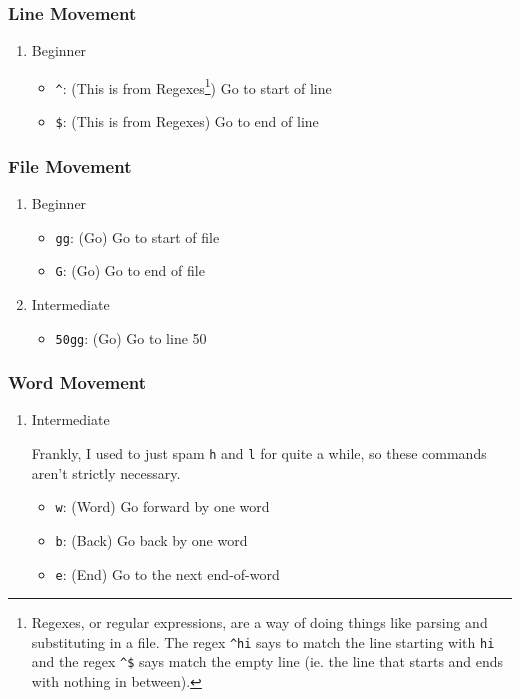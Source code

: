 \documentclass[11pt]{article}
\begin{document}
\subsubsection{Line Movement}
\label{sec:orgc0ae1f2}
\begin{enumerate}
\item Beginner
\label{sec:org67b2ee7}
\begin{itemize}
\item \texttt{\textasciicircum{}}: (This is from Regexes\footnote{Regexes, or regular expressions, are a way of doing things like 
parsing and substituting in a file. The regex \texttt{\textasciicircum{}hi} says to match the 
line starting with \texttt{hi} and the regex \texttt{\textasciicircum{}\$} says match the empty line 
(ie. the line that starts and ends with nothing in between).}) Go to start of line
\item \texttt{\$}: (This is from Regexes) Go to end of line
\end{itemize}
\end{enumerate}
\subsubsection{File Movement}
\label{sec:orgd1d1f8c}
\begin{enumerate}
\item Beginner
\label{sec:orgae4b41d}
\begin{itemize}
\item \texttt{gg}: (Go) Go to start of file
\item \texttt{G}: (Go) Go to end of file
\end{itemize}
\item Intermediate
\label{sec:org197d9e3}
\begin{itemize}
\item \texttt{50gg}: (Go) Go to line 50
\end{itemize}
\end{enumerate}
\subsubsection{Word Movement}
\label{sec:org895fc42}
\begin{enumerate}
\item Intermediate
\label{sec:orgddcd561}

Frankly, I used to just spam \texttt{h} and \texttt{l} for quite a while, so these commands
aren't strictly necessary.

\begin{itemize}
\item \texttt{w}: (Word) Go forward by one word
\item \texttt{b}: (Back) Go back by one word
\item \texttt{e}: (End) Go to the next end-of-word
\end{itemize}
\end{enumerate}
\end{document}
